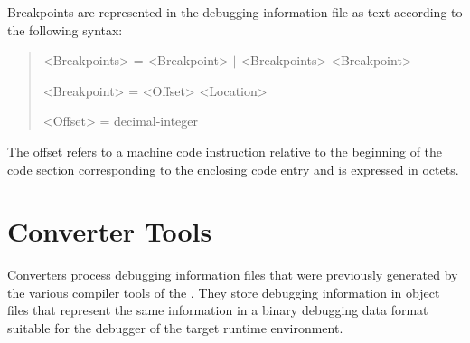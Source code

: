 Breakpoints are represented in the debugging information file as text according to the following syntax:

\begin{quote}\begin{grammar}
<Breakpoints> = <Breakpoint> $\mid$ <Breakpoints> <Breakpoint> \par
<Breakpoint> = <Offset> <Location> \par
<Offset> = decimal-integer \par
\end{grammar}\end{quote}

The offset refers to a machine code instruction relative to the beginning of the code section corresponding to the enclosing code entry and is expressed in octets.

\section{Converter Tools}

Converters process debugging information files that were previously generated by the various compiler tools of the \ecs{}.
They store debugging information in object files that represent the same information in a binary debugging data format suitable for the debugger of the target runtime environment.
\interface

\dbgdwarf

\concludechapter
